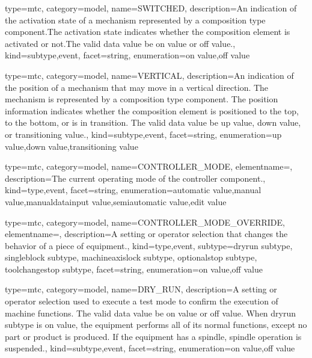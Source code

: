 {
  type=mtc,
  category=model,
  name={SWITCHED},
  description={An indication of the activation state of a mechanism represented by a \gls{composition} type component.\newline The activation state indicates whether the \gls{composition} element is activated or not.\newline The \gls{valid data value} \must be \gls{on value} or \gls{off value}.},
  kind={subtype,event},
  facet={\gls{string}},
  enumeration={\gls{on value},\gls{off value}}
}


{
  type=mtc,
  category=model,
  name={VERTICAL},
  description={An indication of the position of a mechanism that may move in a vertical direction. The mechanism is represented by a \gls{composition} type component. \newline The position information indicates whether the \gls{composition} element is positioned to the top, to the bottom, or is in transition.  \newline The \gls{valid data value} \must be \gls{up value}, \gls{down value}, or \gls{transitioning value}.},
  kind={subtype,event},
  facet={\gls{string}},
  enumeration={\gls{up value},\gls{down value},\gls{transitioning value}}
}


{
  type=mtc,
  category=model,
  name={CONTROLLER\_MODE},
  elementname=,
  description={The current operating mode of the \gls{controller} component.},
  kind={type,event},
  facet={\gls{string}},
  enumeration={\gls{automatic value},\gls{manual value},\gls{manualdatainput value},\gls{semiautomatic value},\gls{edit value}}
}


{
  type=mtc,
  category=model,
  name={CONTROLLER\_MODE\_OVERRIDE},
  elementname=,
  description={A setting or operator selection that changes the behavior of a piece of equipment.},
  kind={type,event},
  subtype={\gls{dryrun subtype}, \gls{singleblock subtype}, \gls{machineaxislock subtype}, \gls{optionalstop subtype}, \gls{toolchangestop subtype}},
  facet={\gls{string}},
  enumeration={\gls{on value},\gls{off value}}
}


{
  type=mtc,
  category=model,
  name={DRY\_RUN},
  description={A setting or operator selection used to execute a test mode to confirm the execution of machine functions. \newline The \gls{valid data value} \must be \gls{on value} or \gls{off value}. \newline When \gls{dryrun subtype} is \gls{on value}, the equipment performs all of its normal functions, except no part or product is produced.  If the equipment has a spindle, spindle operation is suspended.},
  kind={subtype,event},
  facet={\gls{string}},
  enumeration={\gls{on value},\gls{off value}}
}


